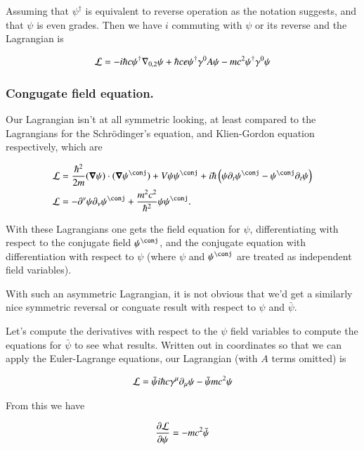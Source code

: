 \documentclass{article}
\begin{document}
Assuming that $\psi^\dagger$ is equivalent to reverse operation as the notation suggests, and that $\psi$ is even grades.  Then we have $i$ commuting with $\psi$ or its reverse and the Lagrangian is

\begin{align}\label{eqn:lag2busted}
\mathcal{L} 
= 
-i \hbar c \psi^\dagger {\nabla}_{0,2} \psi
+ \hbar c e \psi^\dagger \gamma^0 A \psi
- m c^2 \psi^\dagger \gamma^0 \psi
\end{align}

\subsubsection{ Congugate field equation. }

Our Lagrangian isn't at all symmetric looking, at least compared to the Lagrangians for the 
Schr\"{o}dinger's equation, and Klien-Gordon equation respectively, which are

\begin{align}
\LL &= \frac{\hbar^2}{2m}
(\spacegrad \psi) \cdot (\spacegrad \psi^\conj) + V \psi \psi^\conj + {i \hbar} \left( \psi \partial_t \psi^\conj - \psi^\conj \partial_t \psi \right) \\
\LL &= -\partial^\nu \psi \partial_\nu \psi^\conj + \frac{m^2 c^2}{\hbar^2} \psi \psi^\conj.
\end{align}

With these Lagrangians one gets the field equation for $\psi$, differentiating with respect to the conjugate field $\psi^\conj$, and the conjugate equation with differentiation with respect to $\psi$ (where $\psi$ and $\psi^\conj$ are treated as independent field variables).

With such an asymmetric Lagrangian, it is not obvious that we'd get a similarly nice symmetric reversal or conguate result with respect to $\psi$ and $\bar \psi$.

Let's compute the derivatives with respect to the $\psi$ field variables to compute the equations for $\bar \psi$ to see what results.  Written out in coordinates so that we can apply the Euler-Lagrange equations, our Lagrangian (with $A$ terms omitted) is

\begin{align}\label{eqn:lagNoA}
\mathcal{L} = \bar\psi i \hbar c \gamma^\mu \partial_\mu \psi - \bar \psi m c^2 \psi
\end{align}

From this we have

\begin{align*}
\frac{\partial {\mathcal{L}}}{\partial {\psi}} = -m c^2 \bar\psi
\end{align*}
\end{document}
